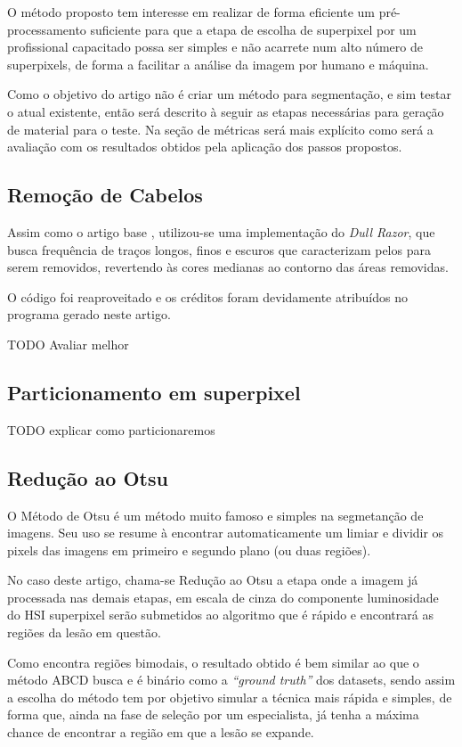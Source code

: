 O método proposto tem interesse em realizar de forma eficiente um pré-processamento suficiente para
que a etapa de escolha de superpixel por um profissional capacitado \cite{santos2020skin} possa ser simples e não acarrete
num alto número de superpixels, de forma a facilitar a análise da imagem por humano e máquina.

Como o objetivo do artigo não é criar um método para segmentação, e sim testar o atual existente, então será descrito à seguir
as etapas necessárias para geração de material para o teste.
Na seção de métricas será mais explícito como será a avaliação com os resultados obtidos pela aplicação dos passos propostos.

\subsection{Remoção de Cabelos}

Assim como o artigo base \cite{santos2020skin}, utilizou-se uma implementação do \emph{Dull Razor}\cite{dullRazorRepo}, que busca frequência de traços longos, finos e escuros que caracterizam pelos para serem removidos, revertendo às cores medianas ao contorno das áreas removidas.

O código foi reaproveitado e os créditos foram devidamente atribuídos no programa gerado neste artigo.

TODO Avaliar melhor

\subsection{Particionamento em superpixel}

TODO explicar como particionaremos

\subsection{Redução ao Otsu}

O Método de Otsu \cite{otsu1979threshold} é um método muito famoso e simples na segmetanção de imagens. Seu uso se resume à encontrar automaticamente um limiar e dividir os pixels das imagens em primeiro e segundo plano (ou duas regiões).

No caso deste artigo, chama-se Redução ao Otsu a etapa onde a imagem já processada nas demais etapas, em escala de cinza do componente luminosidade do HSI superpixel serão submetidos ao algoritmo que é rápido e encontrará as regiões da lesão em questão.

Como encontra regiões bimodais, o resultado obtido é bem similar ao que o método ABCD busca e é binário como a \emph{``ground truth''} dos datasets, sendo assim a escolha do método tem por objetivo simular a técnica mais rápida e simples, de forma que, ainda na fase de seleção por um especialista, já tenha a máxima chance de encontrar a região em que a lesão se expande.
